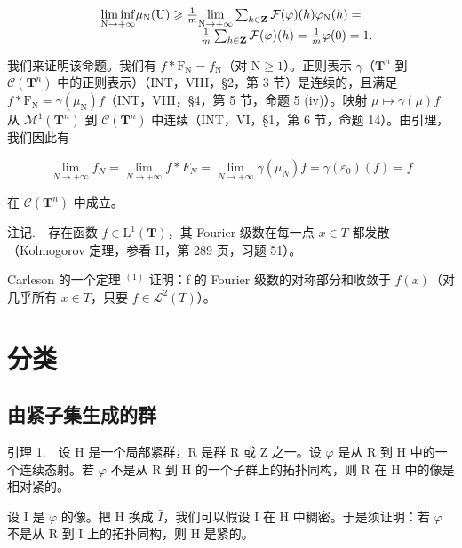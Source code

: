 \[
\begin{array}{r l} & {\underset {\mathrm{N} \to + \infty} {\liminf} \mu_ {\mathrm{N}} (\mathrm{U}) \geqslant \frac {1}{m} \underset {\mathrm{N} \to + \infty} {\lim} \sum_ {h \in \mathbf {Z}} \mathcal {F} (\varphi) (h) \varphi_ {\mathrm{N}} (h) =} \\ & {\qquad \qquad \qquad \qquad \frac {1}{m} \sum_ {h \in \mathbf {Z}} \mathcal {F} (\varphi) (h) = \frac {1}{m} \varphi (0) = 1.} \end{array}
\]

我们来证明该命题。我们有 \(f * \mathrm{F}_{\mathrm{N}} = f_{\mathrm{N}}\)（对 \(\mathrm{N} \geqslant 1\)）。正则表示 \(\gamma\)（\(\mathbf{T}^n\) 到 \(\mathcal{C}(\mathbf{T}^n)\) 中的正则表示）（INT，VIII，§2，第 3 节）是连续的，且满足 \(f * \mathrm{F}_{\mathrm{N}} = \gamma(\mu_{\mathrm{N}})f\)（INT，VIII，§4，第 5 节，命题 5 (iv)）。映射 \(\mu \mapsto \gamma(\mu)f\) 从 \(\mathcal{M}^1(\mathbf{T}^n)\) 到 \(\mathcal{C}(\mathbf{T}^n)\) 中连续（INT，VI，§1，第 6 节，命题 14）。由引理，我们因此有

\[
\lim _ {N \to + \infty} f _ {N} = \lim _ {N \to + \infty} f * F _ {N} = \lim _ {N \to + \infty} \gamma (\mu_ {N}) f = \gamma (\varepsilon_ {0}) (f) = f
\]

在 \(\mathcal{C}(\mathbf{T}^n)\) 中成立。

注记.　存在函数 \(f \in \mathrm{L}^{1}(\mathbf{T})\)，其 Fourier 级数在每一点 \(x \in T\) 都发散（Kolmogorov 定理，参看 II，第 289 页，习题 51）。

Carleson 的一个定理 \(^{(1)}\) 证明：f 的 Fourier 级数的对称部分和收敛于 \(f(x)\)（对几乎所有 \(x \in T\)，只要 \(f \in \mathcal{L}^{2}(T)\)）。

\section{分类}

\subsection{由紧子集生成的群}

引理 1.　设 H 是一个局部紧群，R 是群 R 或 Z 之一。设 \(\varphi\) 是从 R 到 H 中的一个连续态射。若 \(\varphi\) 不是从 R 到 H 的一个子群上的拓扑同构，则 R 在 H 中的像是相对紧的。

设 I 是 \(\varphi\) 的像。把 H 换成 \(\bar{I}\)，我们可以假设 I 在 H 中稠密。于是须证明：若 \(\varphi\) 不是从 R 到 I 上的拓扑同构，则 H 是紧的。

